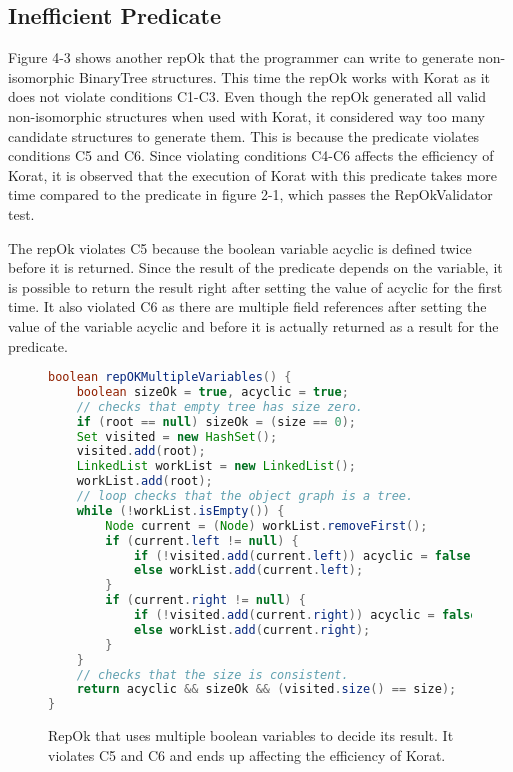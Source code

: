 \subsection{Inefficient Predicate}
Figure 4-3 shows another repOk that the programmer can write to generate non-isomorphic BinaryTree structures. This time the repOk works with Korat as it does not violate conditions C1-C3. Even though the repOk generated all valid non-isomorphic structures when used with Korat, it considered way too many candidate structures to generate them. This is because the predicate violates conditions C5 and C6. Since violating conditions C4-C6 affects the efficiency of Korat, it is observed that the execution of Korat with this predicate takes more time compared to the predicate in figure 2-1, which passes the RepOkValidator test.

\par
The repOk violates C5 because the boolean variable acyclic is defined twice before it is returned. Since the result of the predicate depends on the variable, it is possible to return the result right after setting the value of acyclic for the first time. It also violated C6 as there are multiple field references after setting the value of the variable acyclic and before it is actually returned as a result for the predicate.

\begin{figure}
\centering
\begin{lstlisting}[language=Java]
boolean repOKMultipleVariables() {
    boolean sizeOk = true, acyclic = true;
    // checks that empty tree has size zero.
    if (root == null) sizeOk = (size == 0);
    Set visited = new HashSet();
    visited.add(root);
    LinkedList workList = new LinkedList();
    workList.add(root);
    // loop checks that the object graph is a tree.
    while (!workList.isEmpty()) {
        Node current = (Node) workList.removeFirst();
        if (current.left != null) {
            if (!visited.add(current.left)) acyclic = false;
            else workList.add(current.left);
        }
        if (current.right != null) {
            if (!visited.add(current.right)) acyclic = false;
            else workList.add(current.right);
        }
    }
    // checks that the size is consistent.
    return acyclic && sizeOk && (visited.size() == size);  
}
\end{lstlisting}
\caption{RepOk that uses multiple boolean variables to decide its result. It violates C5 and C6 and ends up affecting the efficiency of Korat.}
\label{fig:repOkMultipleBooleanVariables}
\end{figure}

